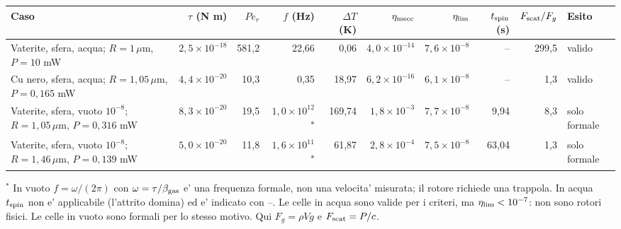 \begingroup\scriptsize\setlength{\tabcolsep}{1.5pt}
\begin{tabular}{@{}p{2.7cm}rrrrrrrrl@{}}
\hline
Caso & $\tau$ (N m) & $Pe_r$ & $f$ (Hz) & $\Delta T$ (K) & $\eta_{\rm mecc}$ & $\eta_{\rm lim}$ & $t_{\rm spin}$ (s) & $F_{\rm scat}/F_g$ & Esito \\
\hline
Vaterite, sfera, acqua; $R=1\,\mu$m, $P=10$ mW & $2{,}5\times10^{-18}$ & 581{,}2 & 22{,}66 & 0{,}06 & $4{,}0\times10^{-14}$ & $7{,}6\times10^{-8}$ & -- & 299{,}5 & valido \\
Cu nero, sfera, acqua; $R=1{,}05\,\mu$m, $P=0{,}165$ mW & $4{,}4\times10^{-20}$ & 10{,}3 & 0{,}35 & 18{,}97 & $6{,}2\times10^{-16}$ & $6{,}1\times10^{-8}$ & -- & 1{,}3 & valido \\
Vaterite, sfera, vuoto $10^{-8}$; $R=1{,}05\,\mu$m, $P=0{,}316$ mW & $8{,}3\times10^{-20}$ & 19{,}5 & $1{,}0\times10^{12}$\textsuperscript{$\ast$} & 169{,}74 & $1{,}8\times10^{-3}$ & $7{,}7\times10^{-8}$ & 9{,}94 & 8{,}3 & solo formale \\
Vaterite, sfera, vuoto $10^{-8}$; $R=1{,}46\,\mu$m, $P=0{,}139$ mW & $5{,}0\times10^{-20}$ & 11{,}8 & $1{,}6\times10^{11}$\textsuperscript{$\ast$} & 61{,}87 & $2{,}8\times10^{-4}$ & $7{,}5\times10^{-8}$ & 63{,}04 & 1{,}3 & solo formale \\
\hline
\end{tabular}
\endgroup

\par\smallskip\noindent\footnotesize $^{\ast}$ In vuoto $f=\omega/(2\pi)$ con $\omega=\tau/\beta_{\rm gas}$ e' una frequenza formale, non una velocita' misurata; il rotore richiede una trappola. In acqua $t_{\rm spin}$ non e' applicabile (l'attrito domina) ed e' indicato con --. Le celle in acqua sono valide per i criteri, ma $\eta_{\rm lim}<10^{-7}$: non sono rotori fisici. Le celle in vuoto sono formali per lo stesso motivo. Qui $F_g=\rho Vg$ e $F_{\rm scat}=P/c$.
